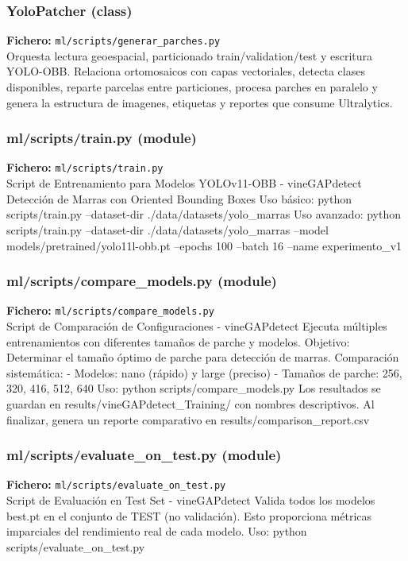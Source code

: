 \subsubsection*{YoloPatcher (class)}
\noindent\textbf{Fichero:} \texttt{ml/scripts/generar\_parches.py}\\
Orquesta lectura geoespacial, particionado train/validation/test y escritura YOLO-OBB. Relaciona ortomosaicos con capas vectoriales, detecta clases disponibles, reparte parcelas entre particiones, procesa parches en paralelo y genera la estructura de imagenes, etiquetas y reportes que consume Ultralytics.


\subsubsection*{ml/scripts/train.py (module)}
\noindent\textbf{Fichero:} \texttt{ml/scripts/train.py}\\
Script de Entrenamiento para Modelos YOLOv11-OBB - vineGAPdetect Detección de Marras con Oriented Bounding Boxes Uso básico: python scripts/train.py --dataset-dir ./data/datasets/yolo\_marras Uso avanzado: python scripts/train.py --dataset-dir ./data/datasets/yolo\_marras --model models/pretrained/yolo11l-obb.pt --epochs 100 --batch 16 --name experimento\_v1


\subsubsection*{ml/scripts/compare\_models.py (module)}
\noindent\textbf{Fichero:} \texttt{ml/scripts/compare\_models.py}\\
Script de Comparación de Configuraciones - vineGAPdetect Ejecuta múltiples entrenamientos con diferentes tamaños de parche y modelos. Objetivo: Determinar el tamaño óptimo de parche para detección de marras. Comparación sistemática: - Modelos: nano (rápido) y large (preciso) - Tamaños de parche: 256, 320, 416, 512, 640 Uso: python scripts/compare\_models.py Los resultados se guardan en results/vineGAPdetect\_Training/ con nombres descriptivos. Al finalizar, genera un reporte comparativo en results/comparison\_report.csv


\subsubsection*{ml/scripts/evaluate\_on\_test.py (module)}
\noindent\textbf{Fichero:} \texttt{ml/scripts/evaluate\_on\_test.py}\\
Script de Evaluación en Test Set - vineGAPdetect Valida todos los modelos best.pt en el conjunto de TEST (no validación). Esto proporciona métricas imparciales del rendimiento real de cada modelo. Uso: python scripts/evaluate\_on\_test.py


